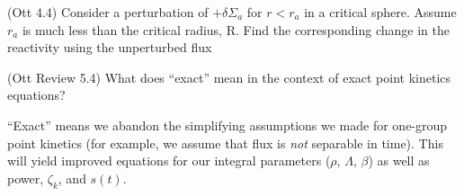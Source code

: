 \documentclass[11pt,addpoints,answers]{exam}
\begin{document}
\begin{questions}
        \question (Ott 4.4) Consider a perturbation of $+\delta \Sigma_a$ 
        for $r< r_a$ in a critical sphere. Assume $r_a$ is much less than the 
        critical radius, R. Find the corresponding change in the reactivity 
        using the unperturbed flux

        \question[5] (Ott Review 5.4) What does ``exact'' mean in the context 
        of exact point kinetics equations?
        \begin{solution}
            ``Exact'' means we abandon the simplifying assumptions we
            made for one-group point kinetics (for example, we assume that
            flux is {\it not} separable in time). This will yield improved
            equations for our integral parameters ($\rho$, $\Lambda$, $\beta$)
            as well as power, $\zeta_{k}$, and $s(t)$.
        \end{solution}
        


\end{questions}
\end{document}
